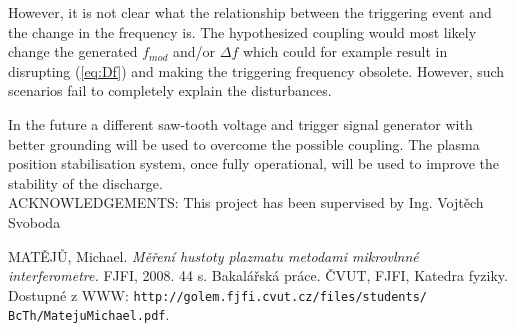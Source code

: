 \documentclass[a4paper,twoside]{articlek}
\begin{document}
However, it is not clear what the relationship between the triggering event and the change in the frequency is. The hypothesized coupling would most likely change the generated $f_{mod}$ and/or $\Delta f$ which could for example result in disrupting (\ref{eq:Df}) and making the triggering frequency obsolete. However, such scenarios fail to completely explain the disturbances.

In the future a different saw-tooth voltage and trigger signal generator with better grounding will be used to overcome the possible coupling. The plasma position stabilisation system, once fully operational, will be used to improve the stability of the discharge.\\

\noindent ACKNOWLEDGEMENTS: This project has been supervised by Ing. Vojtěch Svoboda %


\begin{thebibliography}{99}

   MATĚJŮ, Michael.
   {\em Měření hustoty plazmatu metodami mikrovlnné interferometre. }
   FJFI, 2008. 44 s. Bakalářská práce. ČVUT, FJFI, Katedra fyziky. Dostupné z WWW: {\tt http://golem.fjfi.cvut.cz/files/students/
   BcTh/MatejuMichael.pdf}.
\end{thebibliography}
\end{document}
